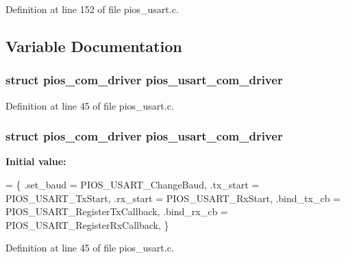 Definition at line 152 of file pios\-\_\-usart.\-c.



\subsection{Variable Documentation}
\hypertarget{group___p_i_o_s___u_s_a_r_t_gae7414398fe53c376d74ea4c0eecb0670}{
\subsubsection[{pios\-\_\-usart\-\_\-com\-\_\-driver}]{\setlength{\rightskip}{0pt plus 5cm}struct {\bf pios\-\_\-com\-\_\-driver} pios\-\_\-usart\-\_\-com\-\_\-driver}}\label{group___p_i_o_s___u_s_a_r_t_gae7414398fe53c376d74ea4c0eecb0670}


Definition at line 45 of file pios\-\_\-usart.\-c.

\hypertarget{group___p_i_o_s___u_s_a_r_t_gae7414398fe53c376d74ea4c0eecb0670}{
\subsubsection[{pios\-\_\-usart\-\_\-com\-\_\-driver}]{\setlength{\rightskip}{0pt plus 5cm}struct {\bf pios\-\_\-com\-\_\-driver} pios\-\_\-usart\-\_\-com\-\_\-driver}}\label{group___p_i_o_s___u_s_a_r_t_gae7414398fe53c376d74ea4c0eecb0670}
{\bfseries Initial value\-:}
\begin{DoxyCode}
= \{
        .set\_baud   = PIOS\_USART\_ChangeBaud,
        .tx\_start   = PIOS\_USART\_TxStart,
        .rx\_start   = PIOS\_USART\_RxStart,
        .bind\_tx\_cb = PIOS\_USART\_RegisterTxCallback,
        .bind\_rx\_cb = PIOS\_USART\_RegisterRxCallback,
\}
\end{DoxyCode}


Definition at line 45 of file pios\-\_\-usart.\-c.

